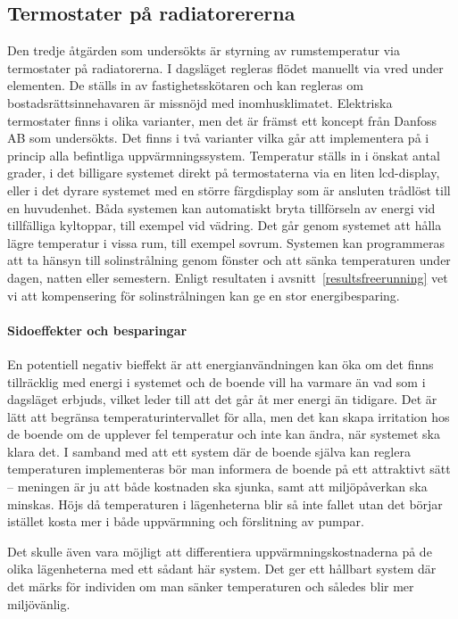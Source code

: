 \subsection{Termostater på radiatorererna}
Den tredje åtgärden som undersökts är styrning av rumstemperatur via termostater på radiatorerna. I dagsläget regleras flödet manuellt via vred under elementen. De ställs in av fastighetsskötaren och kan regleras om bostadsrättsinnehavaren är missnöjd med inomhusklimatet. Elektriska termostater finns i olika varianter, men det är främst ett koncept från Danfoss AB som undersökts. Det finns i två varianter vilka går att implementera på i princip alla befintliga uppvärmningssystem. Temperatur ställs in i önskat antal grader, i det billigare systemet direkt på termostaterna via en liten lcd-display, eller i det dyrare systemet med en större färgdisplay som är ansluten trådlöst till en huvudenhet. Båda systemen kan automatiskt bryta tillförseln av energi vid tillfälliga kyltoppar, till exempel vid vädring. Det går genom systemet att hålla lägre temperatur i vissa rum, till exempel sovrum. Systemen kan programmeras att ta hänsyn till solinstrålning genom fönster och att sänka temperaturen under dagen, natten eller semestern. Enligt resultaten i avsnitt~\ref{resultsfreerunning} vet vi att kompensering för solinstrålningen kan ge en stor energibesparing.

\paragraph{Sidoeffekter och besparingar}
En potentiell negativ bieffekt är att energianvändningen kan öka om det finns tillräcklig med energi i systemet och de boende vill ha varmare än vad som i dagsläget erbjuds, vilket leder till att det går åt mer energi än tidigare. Det är lätt att begränsa temperaturintervallet för alla, men det kan skapa irritation hos de boende om de upplever fel temperatur och inte kan ändra, när systemet ska klara det. I samband med att ett system där de boende själva kan reglera temperaturen implementeras bör man informera de boende på ett attraktivt sätt – meningen är ju att både kostnaden ska sjunka, samt att miljöpåverkan ska minskas. Höjs då temperaturen i lägenheterna blir så inte fallet utan det börjar istället kosta mer i både uppvärmning och förslitning av pumpar. \cite{viivilla}

Det skulle även vara möjligt att differentiera uppvärmningskostnaderna på de olika lägenheterna med ett sådant här system. Det ger ett hållbart system där det märks för individen om man sänker temperaturen och således blir mer miljövänlig. 

